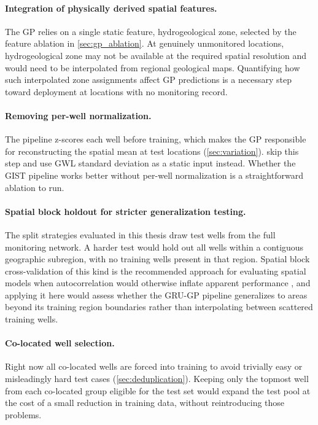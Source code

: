\paragraph{Integration of physically derived spatial features.}
The GP relies on a single static feature, hydrogeological zone, selected by the feature ablation in \cref{sec:gp_ablation}. At genuinely unmonitored locations, hydrogeological zone may not be available at the required spatial resolution and would need to be interpolated from regional geological maps. Quantifying how such interpolated zone assignments affect GP predictions is a necessary step toward deployment at locations with no monitoring record.

\paragraph{Removing per-well normalization.}
The pipeline z-scores each well before training, which makes the GP responsible for reconstructing the spatial mean at test locations (\cref{sec:variation}). \citet{kunz2025} skip this step and use GWL standard deviation as a static input instead. Whether the GIST pipeline works better without per-well normalization is a straightforward ablation to run.

\paragraph{Spatial block holdout for stricter generalization testing.}
The split strategies evaluated in this thesis draw test wells from the full monitoring network. A harder test would hold out all wells within a contiguous geographic subregion, with no training wells present in that region. Spatial block cross-validation of this kind is the recommended approach for evaluating spatial models when autocorrelation would otherwise inflate apparent performance \citep{roberts2017cross}, and applying it here would assess whether the GRU-GP pipeline generalizes to areas beyond its training region boundaries rather than interpolating between scattered training wells.

\paragraph{Co-located well selection.}
Right now all co-located wells are forced into training to avoid trivially easy or misleadingly hard test cases (\cref{sec:deduplication}). Keeping only the topmost well from each co-located group eligible for the test set would expand the test pool at the cost of a small reduction in training data, without reintroducing those problems.

